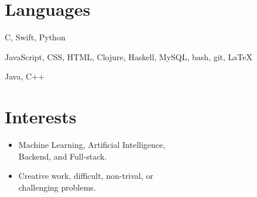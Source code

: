 \documentclass{tccv}
\begin{document}
\section{Languages}

\begin{factlist}

  {C, Swift, Python}

  {JavaScript, CSS, HTML, Clojure, Haskell, MySQL, bash, git, LaTeX}

  {Java, C++}

\end{factlist}

\section{Interests}
\begin{itemize}
\item Machine Learning, Artificial Intelligence, \\
  Backend, and Full-stack.
\item Creative work, difficult, non-trival, or \\
  challenging problems.
\end{itemize}
\end{document}
